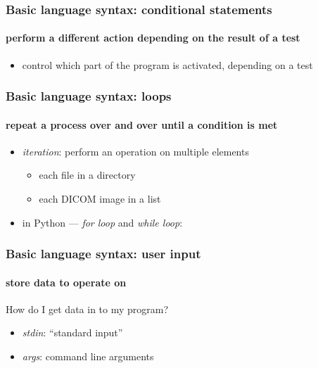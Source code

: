 \documentclass{beamer}
\begin{document}
    \begin{frame}
	    \frametitle{Basic language syntax: conditional statements}
	    \framesubtitle{perform a different action depending on the result of a test}
	    \begin{itemize}
		    \item control which part of the program is activated, depending on a test 
	    \end{itemize}
	    \lstI

    \end{frame}



    \begin{frame}
	    \frametitle{Basic language syntax: loops}
	    \framesubtitle{repeat a process over and over until a condition is met}
	    \begin{itemize}
		    \item \textit{iteration}: perform an operation on multiple elements
			    \begin{itemize}
				    \item each file in a directory
				    \item each DICOM image in a list
			    \end{itemize}
		    \item in Python --- \textit{for loop} and \textit{while loop}:
	    \end{itemize}
	    \lstJ
    \end{frame}




    \begin{frame}
	    \frametitle{Basic language syntax: user input}
	    \framesubtitle{store data to operate on}
	    How do I get data in to my program?
	    \begin{itemize}
		    \item \textit{stdin}: ``standard input''
		    \item \textit{args}: command line arguments
	    \end{itemize}
	    \lstK
    \end{frame}
\end{document}
